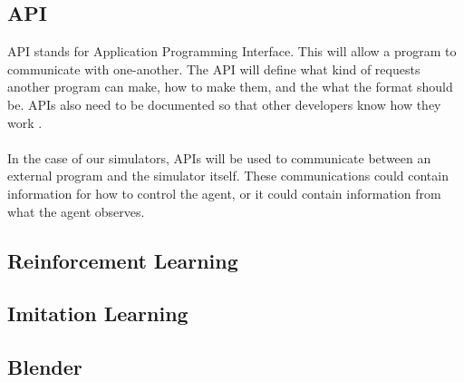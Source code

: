 \subsection{API}
API stands for Application Programming Interface. This will allow a program to communicate with one-another. The API will define what kind of requests another program can make, how to make them, and the what the format should be. APIs also need to be documented so that other developers know how they work \cite{WulfJochen2020FVCw}.
\\~\\
In the case of our simulators, APIs will be used to communicate between an external program and the simulator itself. These communications could contain information for how to control the agent, or it could contain information from what the agent observes. 


\subsection{Reinforcement Learning}

\subsection{Imitation Learning}

\subsection{Blender}
